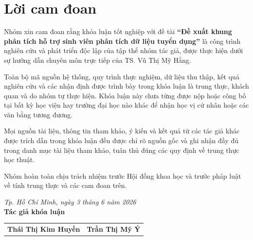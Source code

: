 \chapter*{Lời cam đoan}
\label{commitment}

Nhóm xin cam đoan rằng khóa luận tốt nghiệp với đề tài \textbf{``Đề xuất khung phân tích hỗ trợ sinh viên phân tích dữ liệu tuyển dụng''} là công trình nghiên cứu và phát triển độc lập của tập thể nhóm tác giả, được thực hiện dưới sự hướng dẫn chuyên môn trực tiếp của TS. Vũ Thị Mỹ Hằng.

Toàn bộ mã nguồn hệ thống, quy trình thực nghiệm, dữ liệu thu thập, kết quả nghiên cứu và các nhận định được trình bày trong khóa luận là trung thực, khách quan và do nhóm tự thực hiện. Khóa luận này chưa từng được nộp hoặc công bố tại bất kỳ học viện hay trường đại học nào khác để nhận học vị cử nhân hoặc các văn bằng tương đương.

Mọi nguồn tài liệu, thông tin tham khảo, ý kiến và kết quả từ các tác giả khác được trích dẫn trong khóa luận đều được chỉ rõ nguồn gốc và ghi nhận đầy đủ trong danh mục tài liệu tham khảo, tuân thủ đúng các quy định về trung thực học thuật.

Nhóm hoàn toàn chịu trách nhiệm trước Hội đồng khoa học và trước pháp luật về tính trung thực và các cam đoan trên.

\begin{flushright}
\textit{Tp. Hồ Chí Minh, ngày 3 tháng 6 năm 2026} \\
\textbf{Tác giả khóa luận} \\
\vspace{1.5cm}
\begin{tabular}{cc}
\textbf{Thái Thị Kim Huyền} & \textbf{Trần Thị Mỹ Ý}
\end{tabular}
\end{flushright}